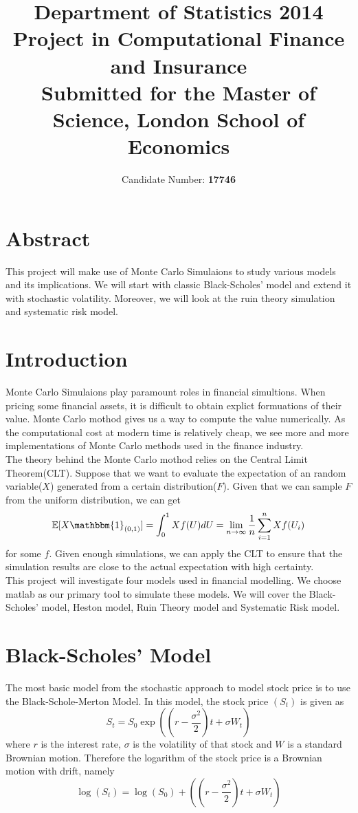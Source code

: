 \documentclass[a4paper, draft, 11pt]{article}
\begin{document}
\title{Department of Statistics 2014\\ {\bf Project in Computational Finance and Insurance}\\ {\small Submitted for the Master of Science, London School of Economics} }
\author{Candidate Number: \bf 17746}
\maketitle
\vfill
\section*{Abstract}
This project will make use of Monte Carlo Simulaions to study various models and its implications. We will start with classic Black-Scholes' model and extend it  with stochastic volatility. Moreover, we will look at the ruin theory simulation and systematic risk model.
\newpage

\tableofcontents
\newpage
\section{Introduction}
Monte Carlo Simulaions play paramount roles in financial simultions. When pricing some financial assets, it is difficult to obtain  explict formuations of their value. Monte Carlo mothod gives us a way to compute the value numerically. As the computational cost at modern time is relatively cheap, we see more and more implementations of Monte Carlo methods used in the finance industry.\\

The theory behind the Monte Carlo mothod relies on the Central Limit Theorem(CLT). Suppose that we want to evaluate the expectation of an random variable($X$) generated from a certain distribution($F$). Given that we can sample $F$ from the uniform distribution, we can get $$\mathbb{E}[X\mathbbm{1}_{(0,1)}] =\int_0^1 Xf(U)dU = \lim_{n\to \infty}\frac{1}{n}\sum^n_{i=1}Xf(U_i)$$ for some $f$. Given enough simulations, we can apply the CLT to ensure that the simulation results are close to the actual expectation with high certainty.\\

This project will investigate four models used in financial modelling. We choose matlab as our primary tool to simulate these models. We will cover the Black-Scholes' model, Heston model, Ruin Theory model and Systematic Risk model.\\
\section{Black-Scholes' Model}
The most basic model from the stochastic approach to model stock price is to use the Black-Schole-Merton Model. In this model, the stock price $(S_t)$ is given as
$$S_t = S_0 \exp\left( (r - \frac{\sigma^2}{2} )t + \sigma W_t \right)$$
where $r$ is the interest rate, $\sigma$ is the volatility of that stock and $W$ is a standard Brownian motion. Therefore the logarithm of the stock price is a Brownian motion with drift, namely 
$$\log(S_t) = \log(S_0) + ((r - \frac{\sigma^2}{2} )t + \sigma W_t )$$
\end{document}
